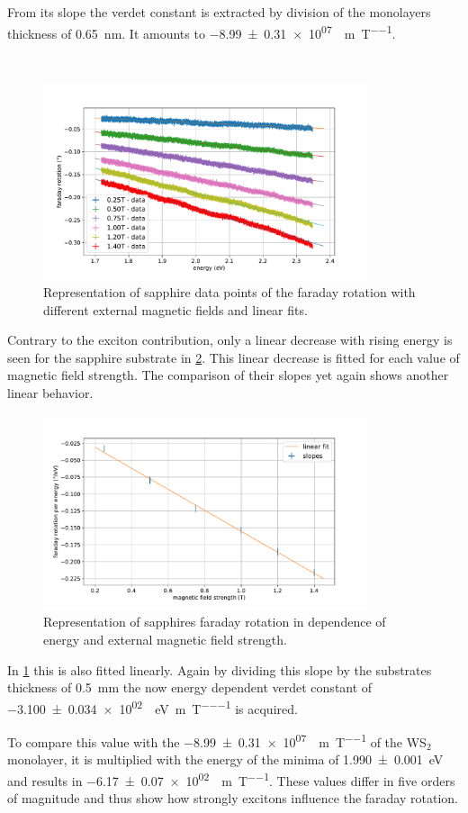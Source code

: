 From its slope the verdet constant is extracted by division of the monolayers thickness of \SI{0.65}{\nano\meter}.
It amounts to \SI{-8.99+-0.31e+07}{\deg\per\meter\per\tesla}.

\

\begin{figure}[!ht]
    \centering
    \includegraphics[width=0.85\textwidth]{plots/sapphire_lins.pdf}
    \caption{Representation of sapphire data points of the faraday rotation with different external magnetic fields and linear fits.}
    \label{fig_sapphire_lins}
\end{figure}
Contrary to the exciton contribution, only a linear decrease with rising energy is seen for the sapphire substrate in \cref{fig_sapphire_slopes}.
This linear decrease is fitted for each value of magnetic field strength.
The comparison of their slopes yet again shows another linear behavior.

\begin{figure}[!ht]
    \centering
    \includegraphics[width=0.85\textwidth]{plots/sapphire_slopes.pdf}
    \caption{Representation of sapphires faraday rotation in dependence of energy and external magnetic field strength.}
    \label{fig_sapphire_slopes}
\end{figure}
In \cref{fig_sapphire_lins} this is also fitted linearly.
Again by dividing this slope by the substrates thickness of \SI{0.5}{\milli\meter} the now energy dependent verdet constant of \SI{-3.100+-0.034e+02}{\deg\per\electronvolt\per\meter\per\tesla} is acquired.

To compare this value with the \SI{-8.99+-0.31e+07}{\deg\per\meter\per\tesla} of the WS$_2$ monolayer, it is multiplied with the energy of the minima of \SI{1.990+-0.001}{\electronvolt} and results in \SI{-6.17+-0.07e+02}{\deg\per\meter\per\tesla}.
These values differ in five orders of magnitude and thus show how strongly excitons influence the faraday rotation.
